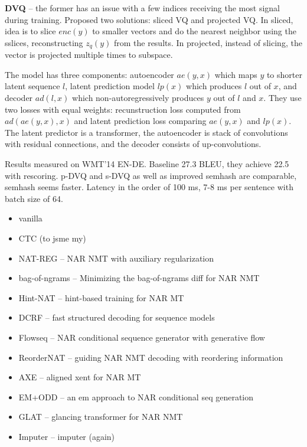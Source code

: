 \textbf{DVQ} -- the former has an issue with a few indices receiving the most signal
during training. Proposed two solutions: sliced VQ and projected VQ. In sliced,
idea is to slice $enc(y)$ to smaller vectors and do the nearest neighbor using
the sslices, reconstructing $z_q(y)$ from the results. In projected, instead of
slicing, the vector is projected multiple times to subspace.

The model has three components: autoencoder $ae(y, x)$ which maps $y$ to shorter
latent sequence $l$, latent prediction model $lp(x)$ which produces $l$ out of
$x$, and decoder $ad(l, x)$ which non-autoregressively produces $y$ out of $l$
and $x$. They use two losses with equal weights: recunstruction loss computed
from $ad(ae(y,x),x)$ and latent prediction loss comparing $ae(y,x)$ and $lp(x)$.
The latent predictor is a transformer, the autoencoder is stack of convolutions
with residual connections, and the decoder consists of up-convolutions.

Results measured on WMT'14 EN-DE. Baseline 27.3 BLEU, they achieve 22.5 with
rescoring. p-DVQ and s-DVQ as well as improved semhash are comparable, semhash
seems faster. Latency in the order of 100 ms, 7-8 ms per sentence with batch
size of 64.

\begin{itemize}
\item vanilla \citep{gu2017nonautoregressive} 
\item CTC (to jsme my)
\item NAT-REG \citep{wang2019nonautoregressive} -- NAR NMT with auxiliary regularization
\item bag-of-ngrams \citep{shao2020minimizing} -- Minimizing the bag-of-ngrams diff for NAR NMT
\item Hint-NAT \citep{li2019hint} -- hint-based training for NAR MT
\item DCRF \citep{sun2019fast} -- fast structured decoding for sequence models
\item Flowseq \citep{ma2019flowseq} -- NAR conditional sequence generator with generative flow
\item ReorderNAT \citep{ran2019guiding} -- guiding NAR NMT decoding with reordering information
\item AXE \citep{ghazvininejad2020aligned} -- aligned xent for NAR MT
\item EM+ODD \citep{sun2020em} -- an em approach to NAR conditional seq generation
\item GLAT \citep{qian2020glancing} -- glancing transformer for NAR NMT
\item Imputer \citep{saharia2020nonautoregressive} -- imputer (again)
\end{itemize}

